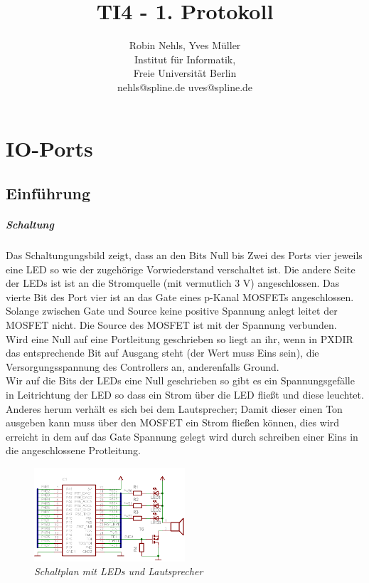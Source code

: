 \documentclass[11pt,a4paper,onecolumn]{report}
\title{TI4 - 1. Protokoll}
\author{Robin Nehls, Yves M\"uller\\
  Institut f\"ur Informatik,\\
  Freie Universit\"at Berlin\\
  nehls@spline.de uves@spline.de }
\date{}
\begin{document}
\maketitle
\tableofcontents

\chapter{IO-Ports}

\section{Einführung}

\paragraph*{Schaltung}
Das Schaltungungsbild zeigt, dass an den Bits Null bis Zwei des Ports vier 
jeweils eine LED so wie der zugehörige Vorwiederstand verschaltet ist. 
Die andere Seite der LEDs ist ist an die Stromquelle (mit vermutlich 3 V) 
angeschlossen. Das vierte Bit des Port vier ist an das Gate eines p-Kanal 
MOSFETs angeschlossen. Solange zwischen Gate und Source keine positive
Spannung anlegt leitet der MOSFET nicht. Die Source des MOSFET ist mit 
der Spannung verbunden. \\
Wird eine Null auf eine Portleitung geschrieben so liegt an ihr, wenn in
PXDIR das entsprechende Bit auf Ausgang steht (der Wert muss Eins sein), 
die Versorgungsspannung des Controllers an, anderenfalls Ground. \\
Wir auf die Bits der LEDs eine Null geschrieben so gibt es ein 
Spannungsgefälle in Leitrichtung der LED so dass ein Strom über die LED 
fließt und diese leuchtet. Anderes herum verhält es sich bei dem 
Lautsprecher; Damit dieser einen Ton ausgeben kann muss über den MOSFET
ein Strom fließen können, dies wird erreicht in dem auf das Gate Spannung 
gelegt wird durch schreiben einer Eins in die angeschlossene Protleitung.

\begin{figure}
\centering
\includegraphics[width=0.5\textwidth]{img/mikrocontrollerUNDled.png}
\caption{\em \small Schaltplan mit LEDs und Lautsprecher}
\end{figure}
\end{document}
